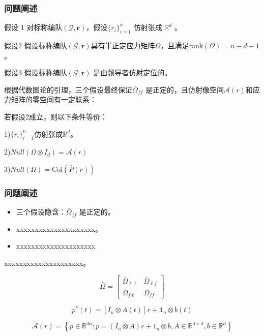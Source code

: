 \documentclass{beamer}
\theoremstyle{remark}
\begin{document}
\begin{frame}
	\frametitle{问题阐述}
	\footnotesize
	\begin{alertblock}{\footnotesize 假设 1} 
		对标称编队$\left(\mathcal{G},  \bm{r}\right)$，假设$\{r_i\}_{i=1}^n$ 仿射张成 $\mathbb{R}^d$ 。
	\end{alertblock}
	\begin{alertblock}{\footnotesize 假设2} 
		假设标称编队$\left(\mathcal{G},\bm{r}\right)$具有半正定应力矩阵$\Omega$，且满足$\mathrm{rank}(\Omega)=n-d-1$。
	\end{alertblock}
	\begin{alertblock}{\footnotesize 假设3} 
		假设标称编队$\left(\mathcal{G},  \bm{r}\right)$ 是由领导者仿射定位的。
	\end{alertblock}
	\normalsize
	根据代数图论的引理，三个假设最终保证$\bar{\Omega}_{ff}$ 是正定的，且仿射像空间$\mathcal{A}(r)$和应力矩阵的零空间有一定联系：
	\footnotesize
	\begin{lemma}
		若假设2成立，则以下条件等价：

		1)$\{r_i\}_{i=1}^n$仿射张成$\mathbb{R}^d$。

		2)$Null(\Omega\otimes I_d)= \mathcal{A}(r)$

		3)$Null(\Omega)=\mathrm{Col}(\bar{P}(r))$
	\end{lemma}
	
\end{frame}
\begin{frame}
	\frametitle{问题阐述}
	\begin{itemize}
		\item  三个假设隐含：$\bar{\Omega}_{ff}$ 是正定的。
		\quad
		\item xxxxxxxxxxxxxxxxxxxxx。
		\item xxxxxxxxxxxxxxxxxxxxx
	\end{itemize}

	xxxxxxxxxxxxxxxxxxxxx。 

	\quad
	\quad
	\begin{equation}
		\left.\bar{\Omega}=\left[\begin{array}{cc}\bar{\Omega}_{\ell\ell}&\bar{\Omega}_{\ell f}\\\bar{\Omega}_{f\ell}&\bar{\Omega}_{ff}\end{array}\right.\right]
	\end{equation}

	\begin{equation}
		p^*(t)=[I_n\otimes A(t)]r+\mathbf{1}_n\otimes b(t)
	\end{equation}

	\begin{equation}
			\mathcal{A}(r)=\left\{p\in\mathbb{R}^{dn}:p=(I_n\otimes A)r+1_n\otimes b, A\in\mathbb{R}^{d\times d},b\in\mathbb{R}^d\right\}
	\end{equation}
\end{frame}
\end{document}
